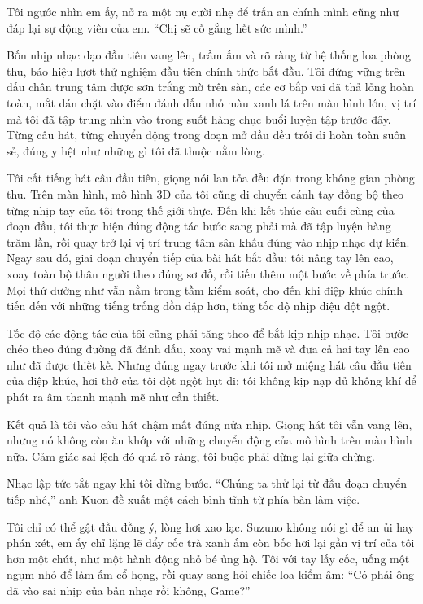 ﻿\documentclass[../main.tex]{subfiles}
\begin{document}
Tôi ngước nhìn em ấy, nở ra một nụ cười nhẹ để trấn an chính mình cũng như đáp lại sự động viên của em. ``Chị sẽ cố gắng hết sức mình.''

\ct

Bốn nhịp nhạc dạo đầu tiên vang lên, trầm ấm và rõ ràng từ hệ thống loa phòng thu, báo hiệu lượt thử nghiệm đầu tiên chính thức bắt đầu. Tôi đứng vững trên dấu chân trung tâm được sơn trắng mờ trên sàn, các cơ bắp vai đã thả lỏng hoàn toàn, mắt dán chặt vào điểm đánh dấu nhỏ màu xanh lá trên màn hình lớn, vị trí mà tôi đã tập trung nhìn vào trong suốt hàng chục buổi luyện tập trước đây. Từng câu hát, từng chuyển động trong đoạn mở đầu đều trôi đi hoàn toàn suôn sẻ, đúng y hệt như những gì tôi đã thuộc nằm lòng.

Tôi cất tiếng hát câu đầu tiên, giọng nói lan tỏa đều đặn trong không gian phòng thu. Trên màn hình, mô hình 3D của tôi cũng di chuyển cánh tay đồng bộ theo từng nhịp tay của tôi trong thế giới thực. Đến khi kết thúc câu cuối cùng của đoạn đầu, tôi thực hiện đúng động tác bước sang phải mà đã tập luyện hàng trăm lần, rồi quay trở lại vị trí trung tâm sân khấu đúng vào nhịp nhạc dự kiến. Ngay sau đó, giai đoạn chuyển tiếp của bài hát bắt đầu: tôi nâng tay lên cao, xoay toàn bộ thân người theo đúng sơ đồ, rồi tiến thêm một bước về phía trước. Mọi thứ dường như vẫn nằm trong tầm kiểm soát, cho đến khi điệp khúc chính tiến đến với những tiếng trống dồn dập hơn, tăng tốc độ nhịp điệu đột ngột.

Tốc độ các động tác của tôi cũng phải tăng theo để bắt kịp nhịp nhạc. Tôi bước chéo theo đúng đường đã đánh dấu, xoay vai mạnh mẽ và đưa cả hai tay lên cao như đã được thiết kế. Nhưng đúng ngay trước khi tôi mở miệng hát câu đầu tiên của điệp khúc, hơi thở của tôi đột ngột hụt đi; tôi không kịp nạp đủ không khí để phát ra âm thanh mạnh mẽ như cần thiết.

Kết quả là tôi vào câu hát chậm mất đúng nửa nhịp. Giọng hát tôi vẫn vang lên, nhưng nó không còn ăn khớp với những chuyển động của mô hình trên màn hình nữa. Cảm giác sai lệch đó quá rõ ràng, tôi buộc phải dừng lại giữa chừng.

Nhạc lập tức tắt ngay khi tôi dừng bước. ``Chúng ta thử lại từ đầu đoạn chuyển tiếp nhé,'' anh Kuon đề xuất một cách bình tĩnh từ phía bàn làm việc.

Tôi chỉ có thể gật đầu đồng ý, lòng hơi xao lạc. Suzuno không nói gì để an ủi hay phán xét, em ấy chỉ lặng lẽ đẩy cốc trà xanh ấm còn bốc hơi lại gần vị trí của tôi hơn một chút, như một hành động nhỏ bé ủng hộ. Tôi với tay lấy cốc, uống một ngụm nhỏ để làm ấm cổ họng, rồi quay sang hỏi chiếc loa kiểm âm: ``Có phải ông đã vào sai nhịp của bản nhạc rồi không, Game?''
\end{document}
